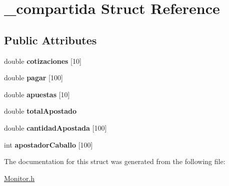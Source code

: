\hypertarget{struct__compartida}{}\section{\+\_\+compartida Struct Reference}
\label{struct__compartida}
\subsection*{Public Attributes}
\begin{DoxyCompactItemize}
\item 
double {\bfseries cotizaciones} \mbox{[}10\mbox{]}\hypertarget{struct__compartida_a259fa4a7e370947a00b1e086b7a74569}{}\label{struct__compartida_a259fa4a7e370947a00b1e086b7a74569}

\item 
double {\bfseries pagar} \mbox{[}100\mbox{]}\hypertarget{struct__compartida_ae2f04a98cd03bd4c5d5de65d08130837}{}\label{struct__compartida_ae2f04a98cd03bd4c5d5de65d08130837}

\item 
double {\bfseries apuestas} \mbox{[}10\mbox{]}\hypertarget{struct__compartida_ab1777bc2c3aa36782018429489447fbe}{}\label{struct__compartida_ab1777bc2c3aa36782018429489447fbe}

\item 
double {\bfseries total\+Apostado}\hypertarget{struct__compartida_ab38a2525c70929d84aa23468c4c3f8bf}{}\label{struct__compartida_ab38a2525c70929d84aa23468c4c3f8bf}

\item 
double {\bfseries cantidad\+Apostada} \mbox{[}100\mbox{]}\hypertarget{struct__compartida_ac49ab9270b19a6c47e0bc0856c6bec41}{}\label{struct__compartida_ac49ab9270b19a6c47e0bc0856c6bec41}

\item 
int {\bfseries apostador\+Caballo} \mbox{[}100\mbox{]}\hypertarget{struct__compartida_a1e2437cb277e108ab91e6f8f379640b5}{}\label{struct__compartida_a1e2437cb277e108ab91e6f8f379640b5}

\end{DoxyCompactItemize}


The documentation for this struct was generated from the following file\+:\begin{DoxyCompactItemize}
\item 
\hyperlink{Monitor_8h}{Monitor.\+h}\end{DoxyCompactItemize}
